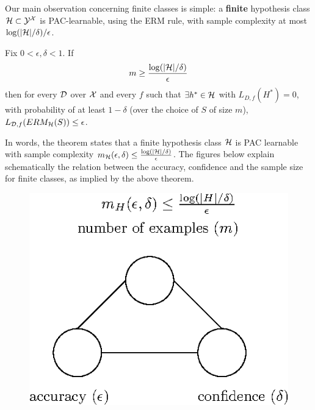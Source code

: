 Our main observation concerning finite classes is simple: a {\bf finite} hypothesis
class $\mathcal{H}\subset\mathcal{Y}^{\mathcal{X}}$ is PAC-learnable, using the ERM rule,
with sample complexity at most 
$\log(|\mathcal{H}|/\delta)/\epsilon$.

\begin{theorem}
  Fix $0< \epsilon,\delta <1$. If \[m \ge \frac{\log(|\mathcal{H}|/\delta)}{\epsilon}\] 
  then for every $\mathcal{D}$ over $\mathcal{X}$ and every $f$ such that $\exists h^*\in\mathcal{H}$ with
  $L_{D,f}(H^*)=0$, with probability of at least $1-\delta$ (over the choice of $S$ of size $m$), $L_{\mathcal{D},f}(ERM_{\mathcal{H}}(S)) \le \epsilon$.
\end{theorem}

In words, the theorem states that a finite hypothesis class $\mathcal{H}$ is PAC
learnable with sample complexity $m_{\mathcal{H}}(\epsilon,\delta)\leq
\frac{\log(|\mathcal{H}|/\delta)}{\epsilon}$.
The figures below explain schematically the relation between the accuracy, confidence and the sample size for finite classes, as implied by the above theorem.



  \begin{figure}[h!]
 \centering\includegraphics[scale=0.8]{connection_m_eps_delta_finite4.eps}
  \end{figure}


